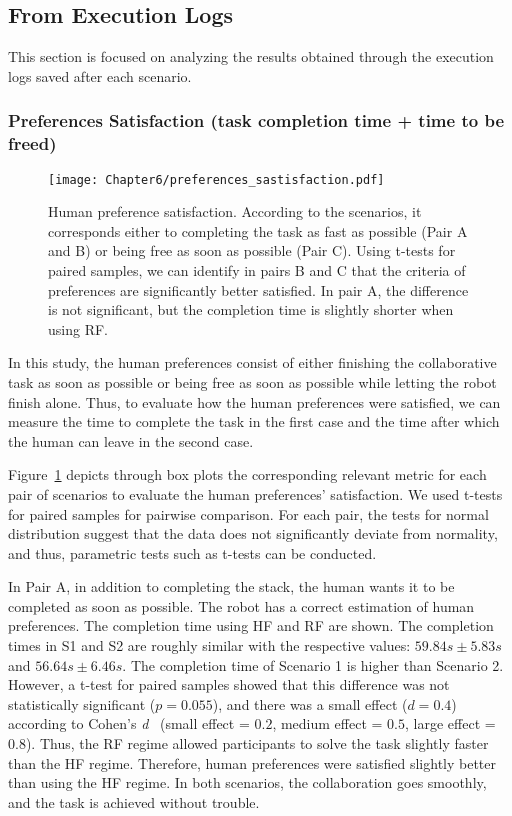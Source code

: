 \subsection{From Execution Logs}

This section is focused on analyzing the results obtained through the execution logs saved after each scenario. 

\subsubsection*{Preferences Satisfaction (task completion time + time to be freed)}

\begin{figure}
    \center
    \texttt{[image: Chapter6/preferences\_sastisfaction.pdf]}
    \caption{Human preference satisfaction. According to the scenarios, it corresponds either to completing the task as fast as possible (Pair A and B) or being free as soon as possible (Pair C). Using t-tests for paired samples, we can identify in pairs B and C that the criteria of preferences are significantly better satisfied. In pair A, the difference is not significant, but the completion time is slightly shorter when using RF.}
    \label{fig:preferences_satisfaction}
\end{figure}

In this study, the human preferences consist of either finishing the collaborative task as soon as possible or being free as soon as possible while letting the robot finish alone. 
Thus, to evaluate how the human preferences were satisfied, we can measure the time to complete the task in the first case and the time after which the human can leave in the second case. 

Figure~\ref{fig:preferences_satisfaction} depicts through box plots the corresponding relevant metric for each pair of scenarios to evaluate the human preferences' satisfaction. We used t-tests for paired samples for pairwise comparison. For each pair, the tests for normal distribution suggest that the data does not significantly deviate from normality, and thus, parametric tests such as t-tests can be conducted.

In Pair A, in addition to completing the stack, the human wants it to be completed as soon as possible. The robot has a correct estimation of human preferences. The completion time using HF and RF are shown. The completion times in S1 and S2 are roughly similar with the respective values: $59.84s \pm 5.83s$ and $56.64s \pm 6.46s$. The completion time of Scenario 1 is higher than Scenario 2. However, a t-test for paired samples showed that this difference was not statistically significant ($p = 0.055$), and there was a small effect ($d = 0.4$) according to Cohen's \textit{d}~\cite{cohen1988concepts} (small effect = $0.2$, medium effect = $0.5$, large effect = $0.8$). Thus, the RF regime allowed participants to solve the task slightly faster than the HF regime. Therefore, human preferences were satisfied slightly better than using the HF regime. 
In both scenarios, the collaboration goes smoothly, and the task is achieved without trouble.

